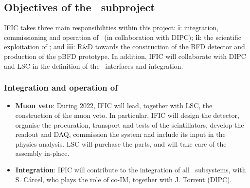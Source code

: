 \subsection{Objectives of the \sIFIC\ subproject}
\label{sec.obj.ific}

IFIC takes three main responsibilities within this project: {\bf i}: integration, commissioning and operation of \Next\ (in collaboration with DIPC); {\bf ii}: the scientific exploitation of \Next; and {\bf iii}: R\&D towards the construction of the BFD detector and production of the pBFD prototype. In addition, IFIC will collaborate with DIPC and LSC in the definition of the \NHD\ interfaces and integration.


\subsubsection*{Integration and operation of \Next}
\begin{itemize}[noitemsep,topsep=0pt,parsep=0pt,partopsep=0pt]
    \item
{\bf Muon veto}:
During 2022,  IFIC will lead, together with LSC, the construction of the muon veto. In particular, IFIC will design the detector, organise the procuration, transport and tests of the scintillators, develop the readout and DAQ, commission the system and include its input in the physics analysis. LSC will purchase the parts, and will take care of the assembly in-place. 
\item {\bf Integration}:  IFIC will contribute to the integration of all \Next\ subsystems, with S. C\'arcel, who plays the role of co-IM, together with J. Torrent (DIPC).  
\end{itemize}

